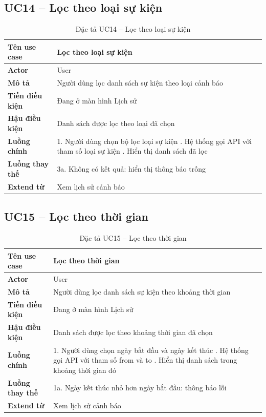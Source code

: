 \subsection*{UC14 -- Lọc theo loại sự kiện}
\begin{table}[H]
    \captionsetup{justification=raggedright, singlelinecheck=false}
    \caption{Đặc tả UC14 -- Lọc theo loại sự kiện}
\centering
\begin{tabular}{|p{3.5cm}|p{10cm}|}
\hline
\textbf{Tên use case} & Lọc theo loại sự kiện \\
\hline
\textbf{Actor} & User \\
\hline
\textbf{Mô tả} & Người dùng lọc danh sách sự kiện theo
  loại cảnh báo \\
\hline
\textbf{Tiền điều kiện} & Đang ở màn hình Lịch sử \\
\hline
\textbf{Hậu điều kiện} & Danh sách được lọc theo loại
  đã chọn \\
\hline
\textbf{Luồng chính} &
  1. Người dùng chọn bộ lọc loại sự kiện \newline
  2. Hệ thống gọi API với tham số loại sự kiện \newline
  3. Hiển thị danh sách đã lọc \\
\hline
\textbf{Luồng thay thế} &
  3a. Không có kết quả: hiển thị thông báo trống \\
\hline
\textbf{Extend từ} & Xem lịch sử cảnh báo \\
\hline
\end{tabular}

\end{table}

\subsection*{UC15 -- Lọc theo thời gian}
\begin{table}[H]
    \captionsetup{justification=raggedright, singlelinecheck=false}
    \caption{Đặc tả UC15 -- Lọc theo thời gian}
\centering
\begin{tabular}{|p{3.5cm}|p{10cm}|}
\hline
\textbf{Tên use case} & Lọc theo thời gian \\
\hline
\textbf{Actor} & User \\
\hline
\textbf{Mô tả} & Người dùng lọc danh sách sự kiện theo
  khoảng thời gian \\
\hline
\textbf{Tiền điều kiện} & Đang ở màn hình Lịch sử \\
\hline
\textbf{Hậu điều kiện} & Danh sách được lọc theo khoảng
  thời gian đã chọn \\
\hline
\textbf{Luồng chính} &
  1. Người dùng chọn ngày bắt đầu và ngày kết thúc \newline
  2. Hệ thống gọi API với tham số from và to \newline
  3. Hiển thị danh sách trong khoảng thời gian đó \\
\hline
\textbf{Luồng thay thế} &
  1a. Ngày kết thúc nhỏ hơn ngày bắt đầu: thông báo lỗi \\
\hline
\textbf{Extend từ} & Xem lịch sử cảnh báo \\
\hline
\end{tabular}

\end{table}

